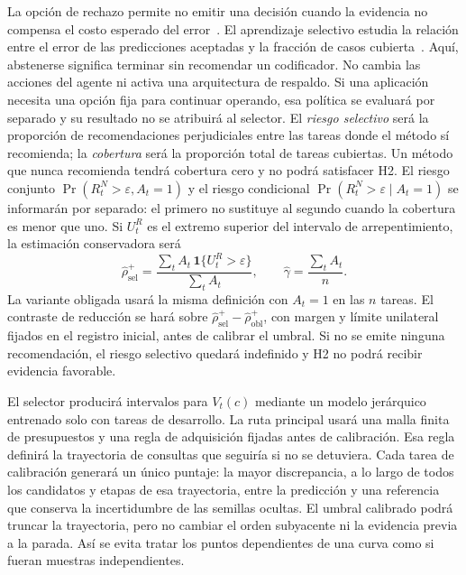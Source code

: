 \documentclass[11pt,letterpaper]{article}
\newcommand{\Vt}{V_t}
\begin{document}
La opción de rechazo permite no emitir una decisión cuando la evidencia no compensa el costo esperado del error~\cite{chow1970reject}.
El aprendizaje selectivo estudia la relación entre el error de las predicciones aceptadas y la fracción de casos cubierta~\cite{geifman2017selective}.
Aquí, abstenerse significa terminar sin recomendar un codificador.
No cambia las acciones del agente ni activa una arquitectura de respaldo.
Si una aplicación necesita una opción fija para continuar operando, esa política se evaluará por separado y su resultado no se atribuirá al selector.
El \emph{riesgo selectivo} será la proporción de recomendaciones perjudiciales entre las tareas donde el método sí recomienda; la \emph{cobertura} será la proporción total de tareas cubiertas.
Un método que nunca recomienda tendrá cobertura cero y no podrá satisfacer H2.
El riesgo conjunto $\Pr(R_t^{N}>\varepsilon,A_t=1)$ y el riesgo condicional $\Pr(R_t^{N}>\varepsilon\mid A_t=1)$ se informarán por separado: el primero no sustituye al segundo cuando la cobertura es menor que uno.
Si $U_t^R$ es el extremo superior del intervalo de arrepentimiento, la estimación conservadora será
\[
  \widehat\rho_{\mathrm{sel}}^+
  =\frac{\sum_t A_t\,\mathbf{1}\{U_t^R>\varepsilon\}}
         {\sum_t A_t},
  \qquad
  \widehat\gamma=\frac{\sum_t A_t}{n}.
\]
La variante obligada usará la misma definición con $A_t=1$ en las $n$ tareas.
El contraste de reducción se hará sobre $\widehat\rho_{\mathrm{sel}}^+-\widehat\rho_{\mathrm{obl}}^+$, con margen y límite unilateral fijados en el registro inicial, antes de calibrar el umbral.
Si no se emite ninguna recomendación, el riesgo selectivo quedará indefinido y H2 no podrá recibir evidencia favorable.

El selector producirá intervalos para $\Vt(c)$ mediante un modelo jerárquico entrenado solo con tareas de desarrollo.
La ruta principal usará una malla finita de presupuestos y una regla de adquisición fijadas antes de calibración.
Esa regla definirá la trayectoria de consultas que seguiría si no se detuviera.
Cada tarea de calibración generará un único puntaje: la mayor discrepancia, a lo largo de todos los candidatos y etapas de esa trayectoria, entre la predicción y una referencia que conserva la incertidumbre de las semillas ocultas.
El umbral calibrado podrá truncar la trayectoria, pero no cambiar el orden subyacente ni la evidencia previa a la parada.
Así se evita tratar los puntos dependientes de una curva como si fueran muestras independientes.
\end{document}

